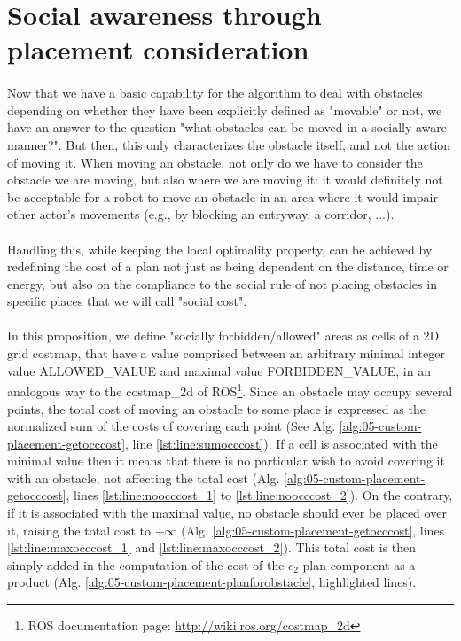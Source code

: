 \section{Social awareness through placement consideration}\label{social_appendix_placement_section}

\paragraph{} Now that we have a basic capability for the algorithm to deal with obstacles depending on whether they have been explicitly defined as "movable" or not, we have an answer to the question "what obstacles can be moved in a socially-aware manner?". But then, this only characterizes the obstacle itself, and not the action of moving it. When moving an obstacle, not only do we have to consider the obstacle we are moving, but also where we are moving it: it would definitely not be acceptable for a robot to move an obstacle in an area where it would impair other actor's movements (e.g., by blocking an entryway, a corridor, ...).

\paragraph{} Handling this, while keeping the local optimality property, can be achieved by redefining the cost of a plan not just as being dependent on the distance, time or energy, but also on the compliance to the social rule of not placing obstacles in specific places that we will call "social cost".

\paragraph{} In this proposition, we define "socially forbidden/allowed" areas as cells of a 2D grid costmap, that have a value comprised between an arbitrary minimal integer value ALLOWED\_VALUE and maximal value FORBIDDEN\_VALUE, in an analogous way to the costmap\_2d of ROS\footnote{ROS documentation page: \url{http://wiki.ros.org/costmap_2d}}. Since an obstacle may occupy several points, the total cost of moving an obstacle to some place is expressed as the normalized sum of the costs of covering each point (See Alg. \ref{alg:05-custom-placement-getocccost}, line \ref{lst:line:sumocccost}). If a cell is associated with the minimal value then it means that there is no particular wish to avoid covering it with an obstacle, not affecting the total cost (Alg. \ref{alg:05-custom-placement-getocccost}, lines \ref{lst:line:noocccost_1} to \ref{lst:line:noocccost_2}). On the contrary, if it is associated with the maximal value, no obstacle should ever be placed over it, raising the total cost to $+\infty$ (Alg. \ref{alg:05-custom-placement-getocccost}, lines \ref{lst:line:maxocccost_1} and \ref{lst:line:maxocccost_2}). This total cost is then simply added in the computation of the cost of the $c_{2}$ plan component as a product (Alg. \ref{alg:05-custom-placement-planforobstacle}, highlighted lines).

